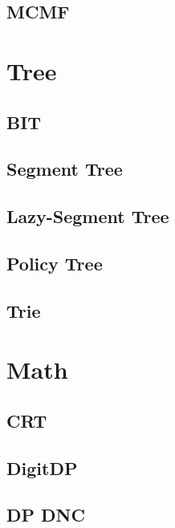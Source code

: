 \subsection{MCMF}
\raggedbottom
\hrulefill

\section{Tree}
\subsection{BIT}
\raggedbottom
\hrulefill
\subsection{Segment Tree}
\raggedbottom
\hrulefill
\subsection{Lazy-Segment Tree}
\raggedbottom
\hrulefill
\subsection{Policy Tree}
\raggedbottom
\hrulefill
\subsection{Trie}
\raggedbottom
\hrulefill

\section{Math}
\subsection{CRT}
\raggedbottom
\hrulefill
\subsection{DigitDP}
\raggedbottom
\hrulefill
\subsection{DP DNC}
\raggedbottom
\hrulefill
